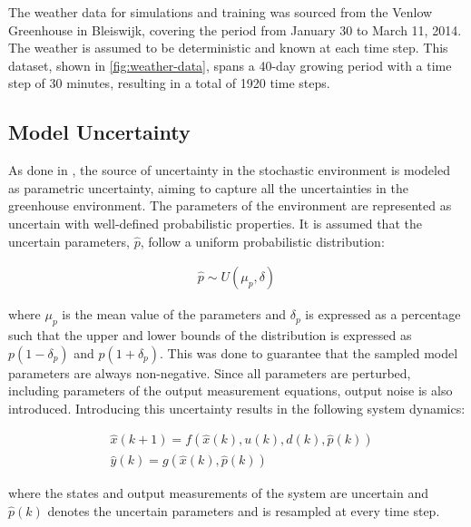 The weather data for simulations and training was sourced from the Venlow Greenhouse in Bleiswijk, covering the period from January 30 to March 11, 2014. The weather is assumed to be deterministic and known at each time step. This dataset, shown in \autoref{fig:weather-data}, spans a 40-day growing period with a time step of 30 minutes, resulting in a total of 1920 time steps.



\subsection{Model Uncertainty}
As done in \cite{boersmaRobustSamplebasedModel2022, lubbersAutonomousGreenhouseClimate2023}, the source of uncertainty in the stochastic environment is modeled as parametric uncertainty, aiming to capture all the uncertainties in the greenhouse environment. The parameters of the environment are represented as uncertain with well-defined probabilistic properties. It is assumed that the uncertain parameters, $\hat{p}$, follow a uniform probabilistic distribution:

\begin{equation}
	\label{eq:uncertainty_model}
	\begin{aligned}
		\hat{p} \sim U(\mu_p, \delta)  
	\end{aligned}
\end{equation}

where $\mu_p$ is the mean value of the parameters and $\delta_p$ is expressed as a percentage such that the upper and lower bounds of the distribution is expressed as $p(1-\delta_p)$ and $p(1+\delta_p)$. This was done to guarantee that the sampled model parameters are always non-negative. Since all parameters are perturbed, including parameters of the output measurement equations, output noise is also introduced. Introducing this uncertainty results in the following system dynamics:

\begin{equation}\label{eq:greenhouse_model_discrete_uncertain}
	\begin{aligned}
		& \hat x(k+1) = f(\hat x(k),u(k),d(k),\hat p(k)) \\
		& \hat y(k) = g(\hat x(k),\hat p(k))
	\end{aligned}
\end{equation}

where the states and output measurements of the system are uncertain and $\hat{p}(k)$ denotes the uncertain parameters and is resampled at every time step.


